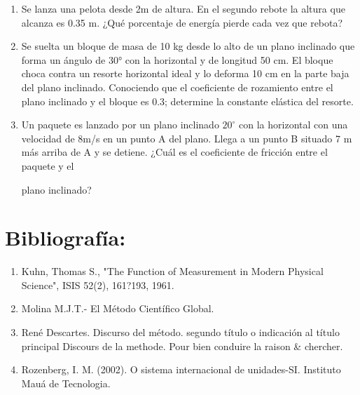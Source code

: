 \documentclass[a5paper,pagesize,10pt,bibtotoc,pointlessnumbers,
normalheadings,DIV=9,fleqn,x11names,table,twoside=false]{scrbook}
\begin{document}
\begin{enumerate}
\item Se lanza
 una pelota desde 2m de altura. En el segundo rebote la altura que alcanza es 0.35 m.
 ¿Qué porcentaje de energía 
pierde cada vez que rebota?

\item Se suelta un bloque de masa de 
 10 kg desde lo alto de un plano inclinado que forma un ángulo de 30° con la horizontal y 
de 
 longitud 50 cm. El bloque choca contra un resorte horizontal ideal y lo deforma 10 cm en la parte 
 baja del plano 
inclinado. Conociendo que el coeficiente de rozamiento entre el plano inclinado y el 
bloque es 0.3; determine la constante 
elástica del resorte.

\item  Un paquete es lanzado por un plano inclinado $20^\circ$ con la
 horizontal con una velocidad de 8m/s en un punto A del 
plano. Llega a un punto B situado
 7 m más arriba de A y se detiene. ¿Cuál es el coeficiente de fricción entre el paquete y el

plano inclinado?

\end{enumerate}


\chapter*{Bibliografía:}

\begin{enumerate}
 \item Kuhn, Thomas S., "The Function of Measurement in Modern Physical Science", ISIS 52(2), 161?193, 1961.
 \item Molina M.J.T.- El Método Científico Global.
 \item René Descartes. Discurso del método. segundo título o indicación al título principal Discours de la methode. Pour bien 
conduire la raison \& chercher.
 \item Rozenberg, I. M. (2002). O sistema internacional de unidades-SI. Instituto Mauá de Tecnologia.
 \end{enumerate}
\end{document}
